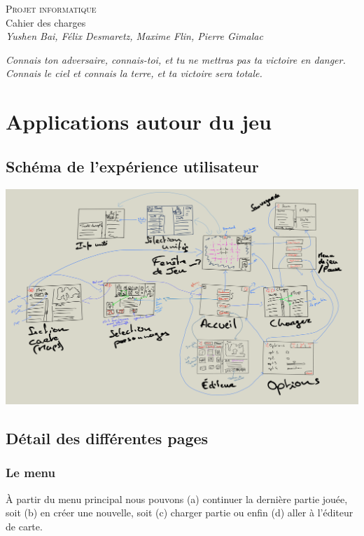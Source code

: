 \documentclass[a4paper,10pt]{article} %
\begin{document}
\begin{titlepage}
\thispagestyle{empty}
\begin{center}
\vspace*{7cm}
\Huge \textsc{Projet informatique}\\
\vspace{1.5cm}
\Large Cahier des charges\\
\vspace{0.5cm}
\large \textit{Yushen Bai, Félix Desmaretz, Maxime Flin, Pierre Gimalac}
\end{center}
\vfill
\large \textit{Connais ton adversaire, connais-toi, et tu ne mettras pas ta victoire en danger. Connais le ciel et connais la terre, et ta victoire sera totale.}
\hfill 
\large 
\restoregeometry
\end{titlepage}

\renewcommand{\contentsname}{Sommaire}
\thispagestyle{empty}
\tableofcontents
\thispagestyle{empty}

\newpage

\section{Applications autour du jeu}
\subsection{Schéma de l'expérience utilisateur}
\includegraphics[width=\textwidth]{wireframe}
\subsection{Détail des différentes pages}
\subsubsection{Le menu}
À partir du menu principal nous pouvons (a) continuer la dernière partie jouée, soit (b) en créer une nouvelle, soit (c) charger partie ou enfin (d) aller à l'éditeur de carte.
\end{document}

